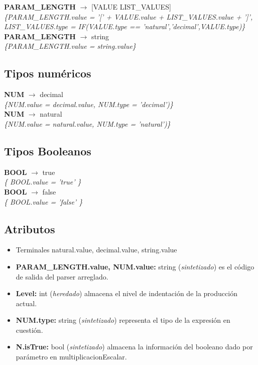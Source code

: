 \documentclass[10pt,a4paper]{article}
\begin{document}
\textbf{PARAM\_LENGTH} $\rightarrow$ [VALUE LIST\_VALUES]\\
\textit{\{PARAM\_LENGTH.value = '[' + VALUE.value + LIST\_VALUES.value + ']', LIST\_VALUES.type = IF(VALUE.type == 'natural','decimal',VALUE.type)\}} \\

\textbf{PARAM\_LENGTH} $\rightarrow$ string \\
\textit{\{PARAM\_LENGTH.value = string.value\}} \\

\subsection{Tipos numéricos}
\textbf{NUM} $\rightarrow$ decimal \\
\textit{\{NUM.value = decimal.value, NUM.type = 'decimal')\}}  \\ 

\textbf{NUM} $\rightarrow$ natural \\
\textit{\{NUM.value = natural.value, NUM.type = 'natural')\}}  \\ 

\subsection{Tipos Booleanos}
\textbf{BOOL} $\rightarrow$ true \\
\textit{\{ BOOL.value = 'true' \}} \\ 

\textbf{BOOL} $\rightarrow$ false \\
\textit{\{ BOOL.value = 'false' \}} \\ 


\subsection{Atributos}

\begin{itemize}
\item Terminales natural.value, decimal.value, string.value
\item \textbf{PARAM\_LENGTH.value, NUM.value:} string (\textit{sintetizado}) es el código de salida del parser arreglado.
\item \textbf{Level:} int (\textit{heredado}) almacena el nivel de indentación de la producción actual.
\item \textbf{NUM.type:} string (\textit{sintetizado}) representa el tipo de la expresión en cuestión.
\item \textbf{N.isTrue:} bool (\textit{sintetizado}) almacena la información del booleano dado por parámetro en multiplicacionEscalar.
\end{itemize}
\end{document}
